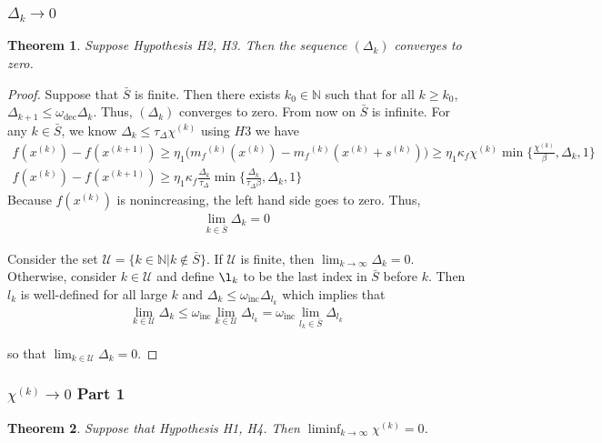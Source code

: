 \documentclass{article}
\newtheorem{theorem}{Theorem}[section]
\theoremstyle{case}
\newcommand{\modelk}{{{m}_f}^{(k)}}
\newcommand{\iteratek}{{x}^{(k)}}
\newcommand{\trialk}{{{s}^{(k)}}}
\newcommand{\chik}{{\chi^{(k)}}}
\newcommand{\omegainc}{\omega_{\text{inc}}}
\newcommand{\omegadec}{\omega_{\text{dec}}}
\newcommand{\ints}{\mathbb N}
\newcommand{\dk}{\Delta_k}
\newcommand{\oalpha}{\tau_{\Delta}}
\newcommand{\xkpo}{{{x}^{(k+1)}}}
\newcommand{\dkpo}{\Delta_{k+1}}
\begin{document}
\subsubsection{$\Delta_k \to 0$}
\begin{theorem}
Suppose Hypothesis H2, H3. Then the sequence $(\dk)$ converges to zero.
\end{theorem}
 
\begin{proof}

Suppose that $\bar{S}$ is finite. Then there exists $k_0 \in \ints$ such that for all $k \ge  k_0$, $\dkpo \le \omegadec \dk$.
Thus, $(\dk)$ converges to zero.
From now on $\bar{S}$ is infinite.
For any $k \in \bar{S}$, we know $\dk \le \oalpha \chik$ using $H3$ we have
\begin{align*}
f(\iteratek) -  f(\xkpo) \ge \eta_1 \big (\modelk(\iteratek) - \modelk(\iteratek + \trialk)\big ) \ge \eta_1 \kappa_f \chik \min\{\frac{\chik}{\beta}, \dk, 1\}\\
f(\iteratek) - f(\xkpo) \ge \eta_1\kappa_f\frac{\dk}{\oalpha}\min\{\frac{\dk}{\oalpha \beta}, \dk, 1\}
\end{align*}
Because $f(\iteratek)$ is nonincreasing, the left hand side goes to zero.
Thus,
\begin{align}
\lim_{k \in \bar{S}} \dk = 0
\end{align}


Consider the set
$\mathcal U = \{ k \in \ints | k \not \in \bar S \}$.
If $\mathcal U$ is finite, then $\lim_{k\to\infty}\dk = 0$.
Otherwise, consider $k \in \mathcal U$ and define $\l_k$ to be the last index in $\bar S$ before $k$.
Then $l_k$ is well-defined for all large $k$  and $\dk \le \omegainc \Delta_{l_k}$ which implies that
\begin{align}
\lim_{k \in \mathcal U } \dk \le \omegainc \lim_{k \in \mathcal U} \Delta_{l_k} = \omegainc \lim_{l_k \in \bar{S}} \Delta_{l_k}
\end{align}

so that $\lim_{k \in \mathcal U} \dk = 0$.

\end{proof}




\subsubsection{$\chik \to 0$ Part 1}
\begin{theorem}
Suppose that Hypothesis H1, H4. Then $\liminf_{k\to\infty} \chik = 0$.
\end{theorem}
 
\end{document}
